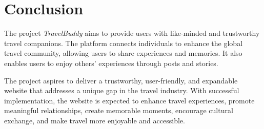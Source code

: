 \documentclass[12pt,a4paper]{report}
\begin{document}
\chapter{Conclusion}

The project \textit{TravelBuddy} aims to provide users with like-minded and trustworthy travel companions. The platform connects individuals to enhance the global travel community, allowing users to share experiences and memories. It also enables users to enjoy others' experiences through posts and stories.

The project aspires to deliver a trustworthy, user-friendly, and expandable website that addresses a unique gap in the travel industry. With successful implementation, the website is expected to enhance travel experiences, promote meaningful relationships, create memorable moments, encourage cultural exchange, and make travel more enjoyable and accessible.


\raggedright
	
\end{document}
